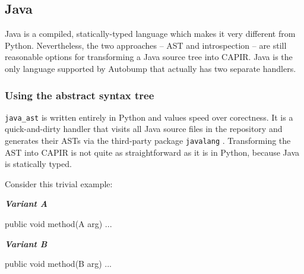 \documentclass{l4proj}
\newenvironment{halfmini}[1]
{
\begin{minipage}[t]{0.5\textwidth}
\noindent\textbf{\textit{#1}}\\
}
{
\end{minipage}
}
\newcommand\genericstyle{\lstset{basicstyle=\ttm}}
\newcommand\codeinline[1]{{\genericstyle\lstinline!#1!}}
\begin{document}
\subsection{Java}
\label{JavaHandlers}

Java is a compiled, statically-typed language which makes it very
different from Python. Nevertheless, the two approaches -- AST
and introspection -- are still reasonable options for transforming a
Java source tree into CAPIR. Java is the only language supported by
Autobump that actually has two separate handlers.

\subsubsection{Using the abstract syntax tree}

\codeinline{java_ast} is written entirely in Python and
values speed over corectness. It is a quick-and-dirty handler that
visits all Java source files in the repository and generates their
ASTs via the third-party package \codeinline{javalang} \cite{Javalang}.
Transforming the AST into CAPIR is not quite as straightforward as it
is in Python, because Java is statically typed.

Consider this trivial example:

\begin{halfmini}{Variant A}
\begin{java}
public void method(A arg) { ... }
\end{java}
\end{halfmini}
\begin{halfmini}{Variant B}
\begin{java}
public void method(B arg) { ... }
\end{java}
\end{halfmini}
\end{document}
